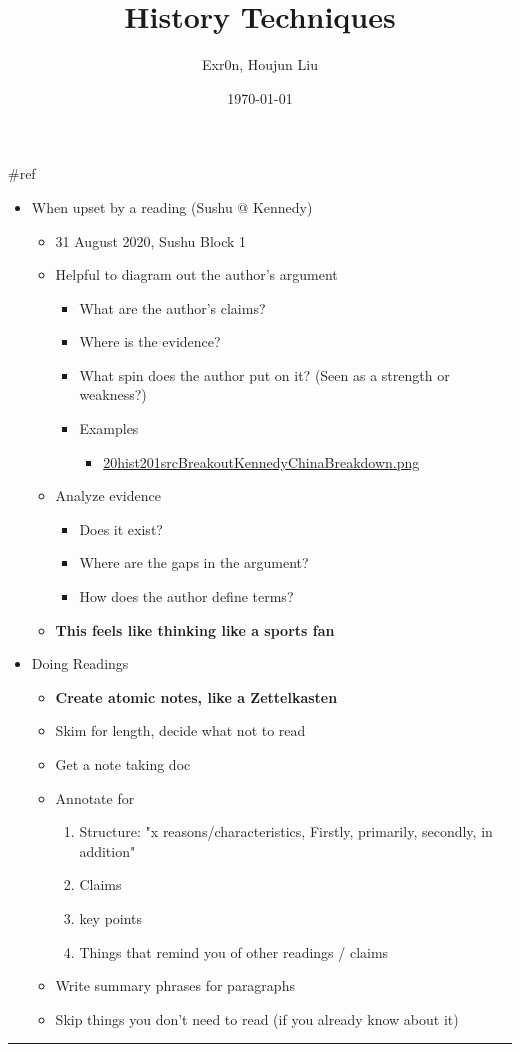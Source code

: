 \documentclass[letterpaper]{article}
\author{Exr0n, Houjun Liu}
\date{\today}
\title{History Techniques}
\renewcommand{\tableofcontents}{}
\begin{document}
\tableofcontents

\#ref

\begin{itemize}
\item When upset by a reading (Sushu @ Kennedy)

\begin{itemize}
\item 31 August 2020, Sushu Block 1
\item Helpful to diagram out the author's argument

\begin{itemize}
\item What are the author's claims?
\item Where is the evidence?
\item What spin does the author put on it? (Seen as a strength or
weakness?)
\item Examples

\begin{itemize}
\item \href{20hist201srcBreakoutKennedyChinaBreakdown.png.org}{20hist201srcBreakoutKennedyChinaBreakdown.png}
\end{itemize}
\end{itemize}

\item Analyze evidence

\begin{itemize}
\item Does it exist?
\item Where are the gaps in the argument?
\item How does the author define terms?
\end{itemize}

\item \textbf{This feels like thinking like a sports fan}
\end{itemize}

\item Doing Readings

\begin{itemize}
\item \textbf{Create atomic notes, like a Zettelkasten}

\item Skim for length, decide what not to read
\item Get a note taking doc
\item Annotate for

\begin{enumerate}
\item Structure: "x reasons/characteristics, Firstly, primarily,
secondly, in addition"
\item Claims
\item key points
\item Things that remind you of other readings / claims
\end{enumerate}

\item Write summary phrases for paragraphs
\item Skip things you don't need to read (if you already know about it)
\end{itemize}
\end{itemize}

\noindent\rule{\textwidth}{0.5pt}
\end{document}
